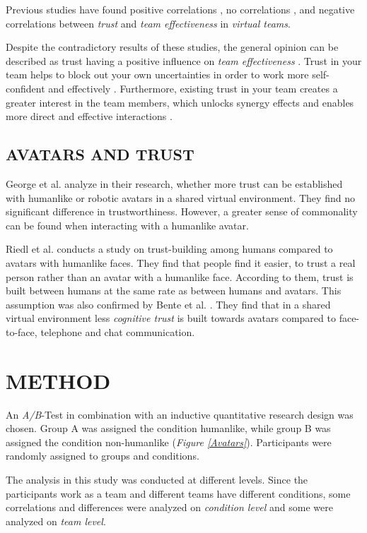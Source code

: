 \documentclass[sigchi]{acmart}
\begin{document}
Previous studies have found positive correlations \citep{davis2000trusted}, no correlations \citep{hertel2004managing}, and negative correlations \citep{dirks1999effects} between \textit{trust} and \textit{team effectiveness} in \textit{virtual teams}.

Despite the contradictory results of these studies, the general opinion can be described as trust having a positive influence on \textit{team effectiveness} \citep{de2016trust}. 
Trust in your team helps to block out your own uncertainties in order to work more self-confident and effectively \citep{de2010does}. Furthermore, existing trust in your team creates a greater interest in the team members, which unlocks synergy effects and enables more direct and effective interactions \citep{dirks1999effects}. 

\subsection{AVATARS AND TRUST}
George et al. \citep{george2018trusting} analyze in their research, whether more trust can be established with humanlike or robotic avatars in a shared virtual environment. They find no significant difference in trustworthiness. However, a greater sense of commonality can be found when interacting with a humanlike avatar.

Riedl et al. \citep{riedl2014trusting} conducts a study on trust-building among humans compared to avatars with humanlike faces. They find that people find it easier, to trust a real person rather than an avatar with a humanlike face. According to them, trust is built between humans at the same rate as between humans and avatars.
This assumption was also confirmed by Bente et al. \citep[p. 54-59]{bente2004social}. They find that in a shared virtual environment less \textit{cognitive trust} is built towards avatars compared to face-to-face, telephone and chat communication.

\section{METHOD}
An \textit{A/B}-Test in combination with an inductive quantitative research design was chosen.
Group A was assigned the condition humanlike, while group B was assigned the condition non-humanlike (\textit{Figure \ref{Avatars}}). Participants were randomly assigned to groups and conditions. 

The analysis in this study was conducted at different levels.
Since the participants work as a team and different teams have different conditions, some correlations and differences were analyzed on \textit{condition level} and some were analyzed on \textit{team level}.
\end{document}

